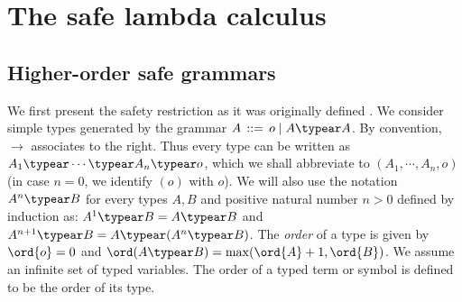 





\section{The safe lambda calculus}
\label{sec:safe}
\subsection*{Higher-order safe grammars}
We first present the safety restriction as it was originally defined
\cite{KNU02}. We consider simple types generated by the grammar $A \,
::= \, o \; | \; A \typear A$. By convention, $\rightarrow$ associates
to the right. Thus every type can be written as $A_1 \typear \cdots
\typear A_n \typear o$, which we shall abbreviate to $(A_1, \cdots,
A_n, o)$ (in case $n = 0$, we identify $(o)$ with $o$).
We will also use the notation $A^n \typear B$ for every types $A, B$ and positive natural number $n>0$ defined by induction as: $A^1 \typear B = A \typear B$  and $A^{n+1} \typear B = A\typear (A^n \typear B)$. The \emph{order} of a type is given by $\ord{o} = 0$ and $\ord(A \typear
B) = \max(\ord{A}+1, \ord{B})$. We assume an infinite set of typed
variables. The order of a typed term or symbol is defined to be the
order of its type.

